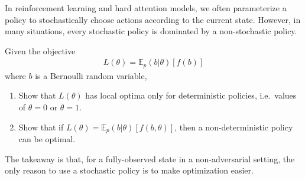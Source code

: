\documentclass{harvardml}
\newcommand{\E}{\mathbb{E}}
\theoremstyle{plain}
\begin{document}
\begin{problem}

In reinforcement learning and hard attention models, we often parameterize a policy to stochastically choose actions according to the current state.
However, in many situations, every stochastic policy is dominated by a non-stochastic policy.

Given the objective
%
\begin{align}
L(\theta) = \E_p(b|\theta) \left[ f(b) \right]
\end{align}
%
where $b$ is a Bernoulli random variable,

\begin{enumerate}[label=(\alph*)]
\item Show that $L(\theta)$ has local optima only for deterministic policies, i.e.\ values of $\theta = 0$ or $\theta = 1$.
\item Show that if $L(\theta) = \E_p(b|\theta) \left[ f(b, \theta) \right]$, then a non-deterministic policy can be optimal.
\end{enumerate}

The takeaway is that, for a fully-observed state in a non-adversarial setting, the only reason to use a stochastic policy is to make optimization easier.
\end{problem}




\end{document}
